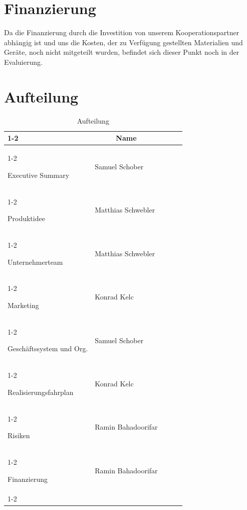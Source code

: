 \documentclass[11pt]{article}
\begin{document}
\section{Finanzierung}

Da die Finanzierung durch die Investition von unserem Kooperationspartner abhängig ist und uns die Kosten, der zu Verfügung gestellten Materialien und Geräte, noch nicht mitgeteilt wurden, befindet sich dieser Punkt noch in der Evaluierung.

\newpage
\section{Aufteilung}
\begin{table}[ht]
	\centering
	\begin{tabular}{|l|l|lll}
		\cline{1-2}
		\multicolumn{1}{|c|}{\textbf{\rule{0pt}{3ex} Thema}} & \multicolumn{1}{c|}{\textbf{Name}} &  &  &  \\ \cline{1-2}

		\rule{0pt}{3ex} Executive Summary                    & Samuel Schober                     &  &  &  \\ \cline{1-2}
		\rule{0pt}{3ex} Produktidee                          & Matthias Schwebler                 &  &  &  \\ \cline{1-2}
		\rule{0pt}{3ex} Unternehmerteam                      & Matthias Schwebler                 &  &  &  \\ \cline{1-2}
		\rule{0pt}{3ex} Marketing                            & Konrad Kelc                        &  &  &  \\ \cline{1-2}
		\rule{0pt}{3ex} Gesch\"aftssystem und Org.           & Samuel Schober                     &  &  &  \\ \cline{1-2}
		\rule{0pt}{3ex} Realisierungsfahrplan                & Konrad Kelc                        &  &  &  \\ \cline{1-2}
		\rule{0pt}{3ex} Risiken                              & Ramin Bahadoorifar                 &  &  &  \\ \cline{1-2}
		\rule{0pt}{3ex} Finanzierung                         & Ramin Bahadoorifar                 &  &  &  \\ \cline{1-2}
	\end{tabular}
	\caption{Aufteilung}
\end{table}
\end{document}
